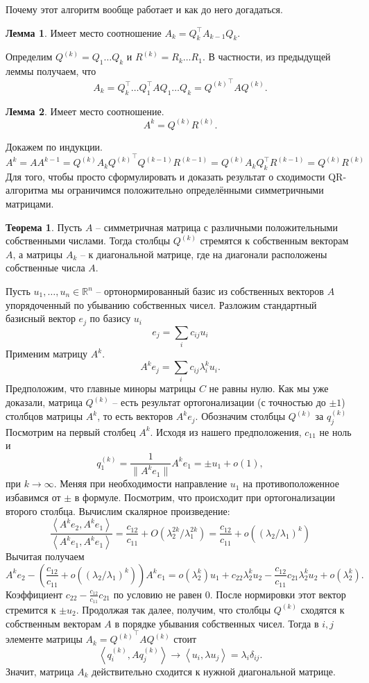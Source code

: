 \documentclass[10pt,a4paper,oneside]{book}
\theoremstyle{definition}
\newtheorem{thm}{\color{red!40!black}Теорема}
\newtheorem{lem}{\color{green!50!black}Лемма}
\newcommand{\mb}[1]{\mathbb{#1}}
\def\lan{\left\langle }
\def\ran{\right\rangle}
\def\thrm{\begin{thm}}
\def\ethrm{\end{thm}}
\def\lm{\begin{lem}}
\def\elm{\end{lem}}
\begin{document}
Почему этот алгоритм вообще работает и как до него догадаться.

\lm Имеет место соотношение $A_k=Q_k^\top A_{k-1} Q_k$.
\elm

Определим $Q^{(k)}=Q_1\dots Q_k$ и $R^{(k)}= R_k \dots R_1$. В частности, из предыдущей леммы получаем, что $$A_k=Q_k^\top \dots Q_1^\top A Q_1 \dots Q_k= {Q^{(k)}}^\top A Q^{(k)}.$$

\lm  Имеет место соотношение. 
$$A^k=Q^{(k)}R^{(k)}.$$
\elm
\proof Докажем по индукции. 
$$A^k=A A^{k-1}= Q^{(k)}A_k{Q^{(k)}}^\top Q^{(k-1)}R^{(k-1)} = Q^{(k)}A_k Q_k^\top R^{(k-1)}=Q^{(k)} R^{(k)}$$
\endproof
Для того, чтобы просто сформулировать и доказать результат о сходимости QR-алгоритма мы ограничимся положительно определёнными симметричными матрицами.

\thrm Пусть $A$ -- симметричная матрица с различными положительными собственными числами. Тогда столбцы $Q^{(k)}$ стремятся к собственным векторам $A$, а матрицы $A_k$ -- к диагональной матрице, где на диагонали расположены собственные числа $A$.
\ethrm
\proof  Пусть $u_1,\dots,u_n \in \mb R^n$ -- ортонормированный базис из собственных векторов $A$ упорядоченный по убыванию собственных чисел.
Разложим стандартный базисный вектор $e_j$ по базису $u_i$
$$e_j = \sum_i c_{ij} u_i $$
Применим матрицу $A^k$. 
$$A^k e_j = \sum_i c_{ij} \lambda_i^k u_i.$$
Предположим, что главные миноры матрицы $C$ не равны нулю.
Как мы уже доказали, матрица $Q^{(k)}$ -- есть результат ортогонализации (с точностью до $\pm 1$) столбцов матрицы $A^k$, то есть векторов $A^k e_j$. Обозначим столбцы $Q^{(k)}$ за $q^{(k)}_j$ Посмотрим на первый столбец $A^k$. Исходя из нашего предположения, $c_{11}$ не ноль и
$$q^{(k)}_1=\frac1{\|A^ke_1\|} A^k e_1 = \pm u_1 + o(1),$$
при $k\to \infty$. Меняя при необходимости направление $u_1$ на противоположенное избавимся от $\pm$ в формуле. Посмотрим, что происходит при ортогонализации второго столбца. Вычислим скалярное произведение:
$$\frac{\lan A^k e_2, A^k e_1 \ran}{\lan A^k e_1, A^k e_1 \ran} = \frac{c_{12}}{c_{11}}+ O\left( \lambda_2^{2k}/\lambda_1^{2k}\right)
=\frac{c_{12}}{c_{11}}+ o \left(\left(\lambda_2/\lambda_1 \right)^k\right)  $$
Вычитая получаем
$$ A^k e_2 - \left(\frac{c_{12}}{c_{11}}+ o \left(\left(\lambda_2/\lambda_1\right)^k\right)\right) A^k e_1= o(\lambda_2^k)u_1+ c_{22}\lambda_2^ku_2 - \frac{c_{12}}{c_{11}}c_{21}\lambda_2^k u_2 +o(\lambda_2^k).$$
Коэффициент $c_{22}-\frac{c_{12}}{c_{11}}c_{21}$ по условию не равен $0$. После нормировки этот вектор стремится к $\pm u_2$. Продолжая так далее, получим, что столбцы $Q^{(k)}$ сходятся к собственным векторам $A$ в порядке убывания собственных чисел. Тогда в $i,j$ элементе матрицы $A_k={Q^{(k)}}^\top A Q^{(k)}$  стоит
$$\lan q^{(k)}_i, Aq^{(k)}_j\ran \to \lan u_i, \lambda u_j \ran = \lambda_i \delta_{ij}.$$
Значит, матрица $A_k$ действительно сходится к нужной диагональной матрице.
\endproof
\end{document}
